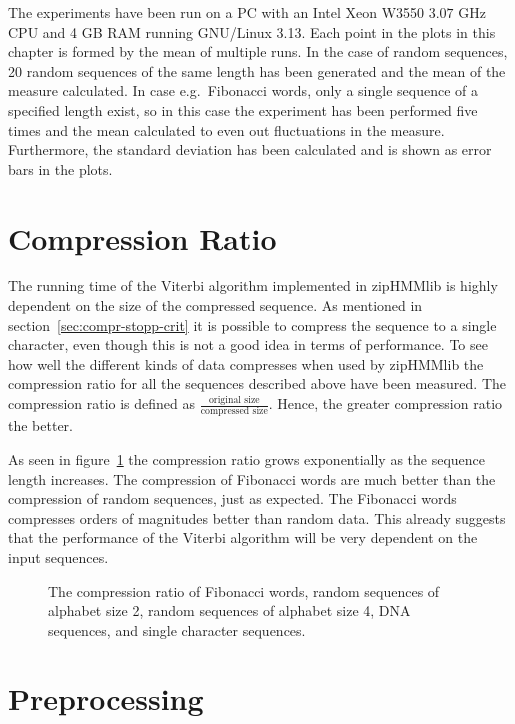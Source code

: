 The experiments have been run on a PC with an Intel Xeon W3550 $3.07$ GHz CPU
and 4 GB RAM running GNU/Linux 3.13. Each point in the plots in this chapter is
formed by the mean of multiple runs. In the case of random sequences, 20 random
sequences of the same length has been generated and the mean of the measure
calculated. In case e.g.\ Fibonacci words, only a single sequence of a
specified length exist, so in this case the experiment has been performed five
times and the mean calculated to even out fluctuations in the
measure. Furthermore, the standard deviation has been calculated and is shown
as error bars in the plots.

\section{Compression Ratio}
\label{sec:compression-ratio}

The running time of the Viterbi algorithm implemented in zipHMMlib is highly
dependent on the size of the compressed sequence. As mentioned in
section~\ref{sec:compr-stopp-crit} it is possible to compress the sequence to a
single character, even though this is not a good idea in terms of
performance. To see how well the different kinds of data compresses when used
by zipHMMlib the compression ratio for all the sequences described above have
been measured. The compression ratio is defined as
$\frac{\text{original size}}{\text{compressed size}}$. Hence, the greater
compression ratio the better.

As seen in figure~\ref{fig:compression_ratio} the compression ratio grows
exponentially as the sequence length increases. The compression of Fibonacci
words are much better than the compression of random sequences, just as
expected. The Fibonacci words compresses orders of magnitudes better than
random data. This already suggests that the performance of the Viterbi
algorithm will be very dependent on the input sequences.  

\begin{figure}
  \centering
  
  \caption{The compression ratio of Fibonacci words, random sequences of
    alphabet size 2, random sequences of alphabet size 4, DNA
    sequences, and single character sequences.}
  \label{fig:compression_ratio}
\end{figure}

\section{Preprocessing}

